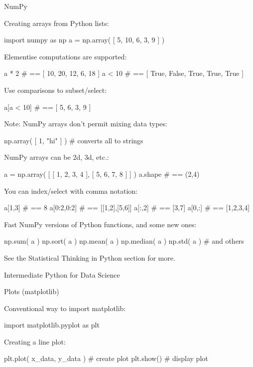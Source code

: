 \documentclass[a4paper,landscape,columns=3]{cheatsheet}
\def\chap#1{\vspace{5mm}\begin{tcolorbox}[colback=red!5!white,colframe=red!75!black,leftrule=3mm]
    \Large #1
\end{tcolorbox}}
\def\sect#1{\begin{tcolorbox}[colback=blue!5!white,colframe=blue!75!black,size=title,leftrule=2mm]
    \large #1
\end{tcolorbox}}
\begin{document}
\sect{NumPy}

Creating arrays from Python lists:
\begin{python}
import numpy as np
a = np.array( [ 5, 10, 6, 3, 9 ] )
\end{python}

Elementise computations are supported:
\begin{python}
a * 2       # == [ 10, 20, 12, 6, 18 ]
a < 10      # == [ True, False, True, True, True ]
\end{python}

Use comparisons to subset/select:
\begin{python}
a[a < 10]   # == [ 5, 6, 3, 9 ]
\end{python}

Note: NumPy arrays don't permit mixing data types:
\begin{python}
np.array( [ 1, "hi" ] )  # converts all to strings
\end{python}

NumPy arrays can be 2d, 3d, etc.:
\begin{python}
a = np.array( [ [ 1, 2, 3, 4 ],
                [ 5, 6, 7, 8 ] ] )
a.shape     # == (2,4)
\end{python}

You can index/select with comma notation:
\begin{python}
a[1,3]      # == 8
a[0:2,0:2]  # == [[1,2],[5,6]]
a[:,2]      # == [3,7]
a[0,:]      # == [1,2,3,4]
\end{python}

Fast NumPy versions of Python functions, and some new ones:
\begin{python}
np.sum( a )
np.sort( a )
np.mean( a )
np.median( a )
np.std( a )
# and others
\end{python}

See the Statistical Thinking in Python section for more.

\chap{Intermediate Python for Data Science}

\sect{Plots (matplotlib)}

Conventional way to import matplotlib:
\begin{python}
import matplotlib.pyplot as plt
\end{python}

Creating a line plot:
\begin{python}
plt.plot( x_data, y_data )     # create plot
plt.show()                     # display plot
\end{python}
\end{document}
